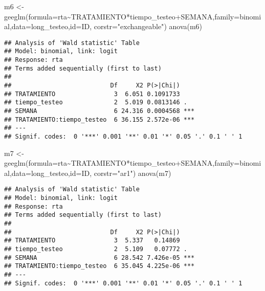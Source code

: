 \documentclass[
]{article}
\newenvironment{Shaded}{\begin{snugshade}}{\end{snugshade}}
\newcommand{\AttributeTok}[1]{\textcolor[rgb]{0.77,0.63,0.00}{#1}}
\newcommand{\FunctionTok}[1]{\textcolor[rgb]{0.00,0.00,0.00}{#1}}
\newcommand{\NormalTok}[1]{#1}
\newcommand{\OtherTok}[1]{\textcolor[rgb]{0.56,0.35,0.01}{#1}}
\newcommand{\SpecialCharTok}[1]{\textcolor[rgb]{0.00,0.00,0.00}{#1}}
\newcommand{\StringTok}[1]{\textcolor[rgb]{0.31,0.60,0.02}{#1}}
\begin{document}
\begin{Shaded}
\begin{Highlighting}[]
\NormalTok{m6 }\OtherTok{\textless{}{-}} \FunctionTok{geeglm}\NormalTok{(}\AttributeTok{formula=}\NormalTok{rta}\SpecialCharTok{\textasciitilde{}}\NormalTok{TRATAMIENTO}\SpecialCharTok{*}\NormalTok{tiempo\_testeo}\SpecialCharTok{+}\NormalTok{SEMANA,}\AttributeTok{family=}\NormalTok{binomial,}\AttributeTok{data=}\NormalTok{long\_testeo,}\AttributeTok{id=}\NormalTok{ID,}
             \AttributeTok{corstr=}\StringTok{"exchangeable"}\NormalTok{)}
\FunctionTok{anova}\NormalTok{(m6)}
\end{Highlighting}
\end{Shaded}

\begin{verbatim}
## Analysis of 'Wald statistic' Table
## Model: binomial, link: logit
## Response: rta
## Terms added sequentially (first to last)
## 
##                           Df     X2 P(>|Chi|)    
## TRATAMIENTO                3  6.051 0.1091733    
## tiempo_testeo              2  5.019 0.0813146 .  
## SEMANA                     6 24.316 0.0004568 ***
## TRATAMIENTO:tiempo_testeo  6 36.155 2.572e-06 ***
## ---
## Signif. codes:  0 '***' 0.001 '**' 0.01 '*' 0.05 '.' 0.1 ' ' 1
\end{verbatim}

\begin{Shaded}
\begin{Highlighting}[]
\NormalTok{m7 }\OtherTok{\textless{}{-}} \FunctionTok{geeglm}\NormalTok{(}\AttributeTok{formula=}\NormalTok{rta}\SpecialCharTok{\textasciitilde{}}\NormalTok{TRATAMIENTO}\SpecialCharTok{*}\NormalTok{tiempo\_testeo}\SpecialCharTok{+}\NormalTok{SEMANA,}\AttributeTok{family=}\NormalTok{binomial,}\AttributeTok{data=}\NormalTok{long\_testeo,}\AttributeTok{id=}\NormalTok{ID,}
             \AttributeTok{corstr=}\StringTok{"ar1"}\NormalTok{)}
\FunctionTok{anova}\NormalTok{(m7)}
\end{Highlighting}
\end{Shaded}

\begin{verbatim}
## Analysis of 'Wald statistic' Table
## Model: binomial, link: logit
## Response: rta
## Terms added sequentially (first to last)
## 
##                           Df     X2 P(>|Chi|)    
## TRATAMIENTO                3  5.337   0.14869    
## tiempo_testeo              2  5.109   0.07772 .  
## SEMANA                     6 28.542 7.426e-05 ***
## TRATAMIENTO:tiempo_testeo  6 35.045 4.225e-06 ***
## ---
## Signif. codes:  0 '***' 0.001 '**' 0.01 '*' 0.05 '.' 0.1 ' ' 1
\end{verbatim}
\end{document}
